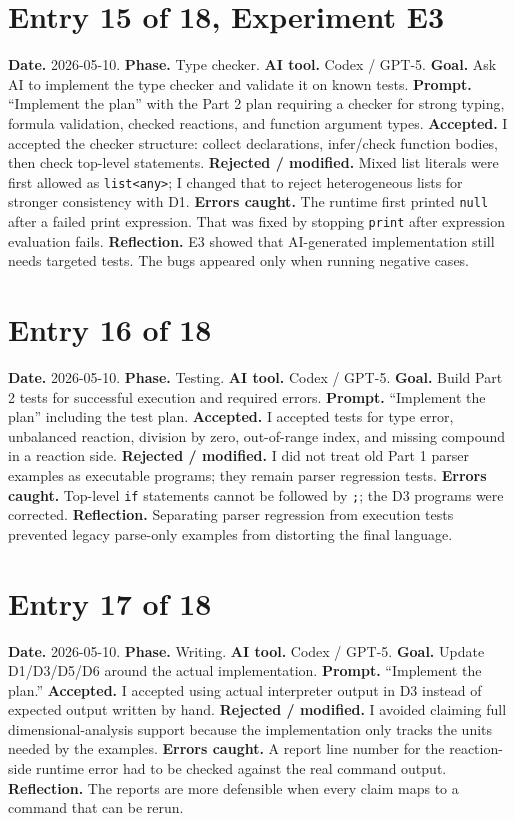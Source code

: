 \documentclass[11pt,a4paper]{article}
\newcommand{\code}[1]{\texttt{#1}}
\begin{document}
\section*{Entry 15 of 18, Experiment E3}
\textbf{Date.} 2026-05-10.
\textbf{Phase.} Type checker.
\textbf{AI tool.} Codex / GPT-5.
\textbf{Goal.} Ask AI to implement the type checker and validate it on known tests.
\textbf{Prompt.} ``Implement the plan'' with the Part 2 plan requiring a checker for strong typing, formula validation, checked reactions, and function argument types.
\textbf{Accepted.} I accepted the checker structure: collect declarations, infer/check function bodies, then check top-level statements.
\textbf{Rejected / modified.} Mixed list literals were first allowed as \code{list<any>}; I changed that to reject heterogeneous lists for stronger consistency with D1.
\textbf{Errors caught.} The runtime first printed \code{null} after a failed print expression. That was fixed by stopping \code{print} after expression evaluation fails.
\textbf{Reflection.} E3 showed that AI-generated implementation still needs targeted tests. The bugs appeared only when running negative cases.

\section*{Entry 16 of 18}
\textbf{Date.} 2026-05-10.
\textbf{Phase.} Testing.
\textbf{AI tool.} Codex / GPT-5.
\textbf{Goal.} Build Part 2 tests for successful execution and required errors.
\textbf{Prompt.} ``Implement the plan'' including the test plan.
\textbf{Accepted.} I accepted tests for type error, unbalanced reaction, division by zero, out-of-range index, and missing compound in a reaction side.
\textbf{Rejected / modified.} I did not treat old Part 1 parser examples as executable programs; they remain parser regression tests.
\textbf{Errors caught.} Top-level \code{if} statements cannot be followed by \code{;}; the D3 programs were corrected.
\textbf{Reflection.} Separating parser regression from execution tests prevented legacy parse-only examples from distorting the final language.

\section*{Entry 17 of 18}
\textbf{Date.} 2026-05-10.
\textbf{Phase.} Writing.
\textbf{AI tool.} Codex / GPT-5.
\textbf{Goal.} Update D1/D3/D5/D6 around the actual implementation.
\textbf{Prompt.} ``Implement the plan.''
\textbf{Accepted.} I accepted using actual interpreter output in D3 instead of expected output written by hand.
\textbf{Rejected / modified.} I avoided claiming full dimensional-analysis support because the implementation only tracks the units needed by the examples.
\textbf{Errors caught.} A report line number for the reaction-side runtime error had to be checked against the real command output.
\textbf{Reflection.} The reports are more defensible when every claim maps to a command that can be rerun.
\end{document}
